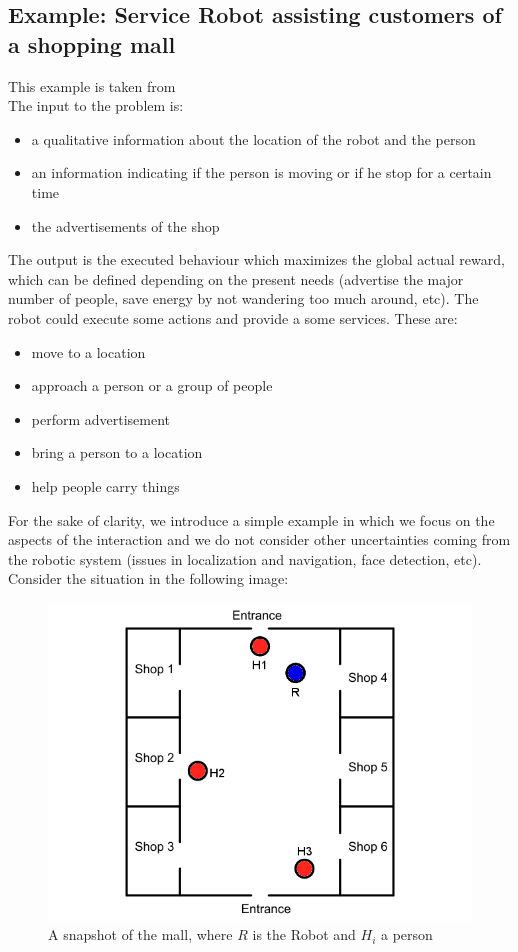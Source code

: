 \documentclass[pdftex,12pt,a4paper]{report}
\begin{document}
\subsection{Example: Service Robot assisting customers of a shopping mall}
This example is taken from \cite{iocchi2016practical} \\ %
The input to the problem is:
\begin{itemize}
\item a qualitative information about the location of the robot and the person
\item an information indicating if the person is moving or if he stop for a certain time 
\item the advertisements of the shop
\end{itemize} 
The output is the executed behaviour which maximizes the global actual reward, which can be defined depending on the present needs (advertise the major number of people, save energy by not wandering too much around, etc). 
The robot could execute some actions and provide a some services. These are: 
\begin{itemize}
\item move to a location
\item approach a person or a group of people
\item perform advertisement
\item bring a person to a location
\item help people carry things
\end{itemize}
For the sake of clarity, we introduce a simple example in which we focus on the aspects of the interaction and we do not consider other uncertainties coming from the robotic system (issues in localization and navigation, face detection, etc). 
Consider the situation in the following image:
\begin{figure}[H]
	\centering
	\includegraphics[scale=0.5]{images/mall_situation1.png}
	\caption{A snapshot of the mall, where $R$ is the Robot and $H_i$ a person}
	\label{fig:mall_1}
\end{figure}
\end{document}
